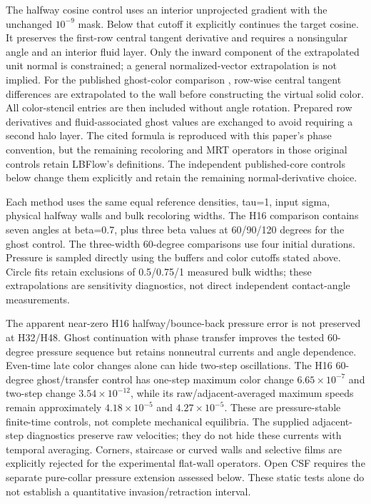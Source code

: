 \documentclass[11pt]{article}
\begin{document}
The halfway cosine control uses an interior unprojected gradient with the
unchanged $10^{-9}$ mask. Below that cutoff it explicitly continues the
target cosine. It preserves the first-row central tangent derivative and
requires a nonsingular angle and an interior fluid layer. Only the inward
component of the extrapolated unit normal is constrained; a general
normalized-vector extrapolation is not implied.
For the published ghost-color comparison \cite{liu2015}, row-wise central
tangent differences are extrapolated to the wall before constructing the
virtual solid color. All color-stencil entries are then included without
angle rotation. Prepared row derivatives and fluid-associated ghost values
are exchanged to avoid requiring a second halo layer. The cited formula
is reproduced with this paper's phase convention, but the remaining
recoloring and MRT operators in those original controls retain LBFlow's
definitions. The independent published-core controls below change them
explicitly and retain the remaining normal-derivative choice.

Each method uses the same equal reference densities, tau=1, input sigma,
physical halfway walls and bulk recoloring widths. The H16 comparison
contains seven angles at beta=0.7, plus three beta values at 60/90/120
degrees for the ghost control. The three-width 60-degree comparisons use
four initial durations. Pressure is sampled directly using the buffers
and color cutoffs stated above. Circle fits retain exclusions of
0.5/0.75/1 measured bulk widths; these extrapolations are sensitivity
diagnostics, not direct independent contact-angle measurements.



The apparent near-zero H16 halfway/bounce-back pressure error is not
preserved at H32/H48. Ghost continuation with phase transfer improves the
tested 60-degree pressure sequence but retains nonneutral currents and
angle dependence. Even-time late color changes alone can hide two-step
oscillations. The H16 60-degree ghost/transfer control has one-step maximum
color change $6.65\times10^{-7}$ and two-step change
$3.54\times10^{-12}$, while its raw/adjacent-averaged maximum speeds remain
approximately $4.18\times10^{-5}$ and $4.27\times10^{-5}$.
These are pressure-stable finite-time controls, not complete mechanical
equilibria. The supplied adjacent-step diagnostics preserve raw
velocities; they do not hide these currents with temporal averaging.
Corners, staircase or curved walls and selective films are explicitly
rejected for the experimental flat-wall operators. Open CSF requires the
separate pure-collar pressure extension assessed below. These static tests
alone do not establish a quantitative invasion/retraction interval.
\end{document}
